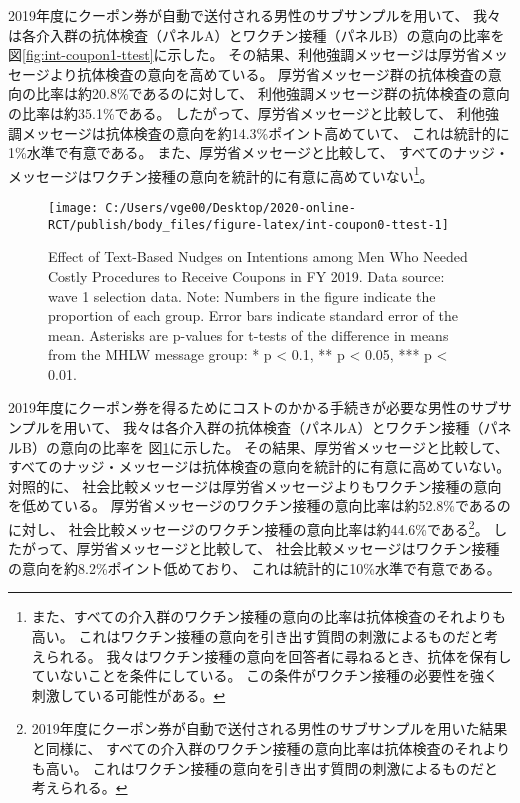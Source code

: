 \documentclass[
  11pt,
  a4paper,
]{article}
\begin{document}
2019年度にクーポン券が自動で送付される男性のサブサンプルを用いて、
我々は各介入群の抗体検査（パネルA）とワクチン接種（パネルB）の意向の比率を
図\ref{fig:int-coupon1-ttest}に示した。
その結果、利他強調メッセージは厚労省メッセージより抗体検査の意向を高めている。
厚労省メッセージ群の抗体検査の意向の比率は約20.8\%であるのに対して、
利他強調メッセージ群の抗体検査の意向の比率は約35.1\%である。
したがって、厚労省メッセージと比較して、
利他強調メッセージは抗体検査の意向を約14.3\%ポイント高めていて、
これは統計的に1\%水準で有意である。
また、厚労省メッセージと比較して、
すべてのナッジ・メッセージはワクチン接種の意向を統計的に有意に高めていない\footnote{また、すべての介入群のワクチン接種の意向の比率は抗体検査のそれよりも高い。
  これはワクチン接種の意向を引き出す質問の刺激によるものだと考えられる。
  我々はワクチン接種の意向を回答者に尋ねるとき、抗体を保有していないことを条件にしている。
  この条件がワクチン接種の必要性を強く刺激している可能性がある。}。

\begin{figure}[t]
\texttt{[image: C:/Users/vge00/Desktop/2020-online-RCT/publish/body\_files/figure-latex/int-coupon0-ttest-1]} \caption{Effect of Text-Based Nudges on Intentions among Men Who Needed Costly Procedures to Receive Coupons in FY 2019. Data source: wave 1 selection data. Note: Numbers in the figure indicate the proportion of each group. Error bars indicate standard error of the mean. Asterisks are p-values for t-tests of the difference in means from the MHLW message group: * p < 0.1, ** p < 0.05, *** p < 0.01.}\label{fig:int-coupon0-ttest}
\end{figure}

2019年度にクーポン券を得るためにコストのかかる手続きが必要な男性のサブサンプルを用いて、
我々は各介入群の抗体検査（パネルA）とワクチン接種（パネルB）の意向の比率を
図\ref{fig:int-coupon0-ttest}に示した。
その結果、厚労省メッセージと比較して、
すべてのナッジ・メッセージは抗体検査の意向を統計的に有意に高めていない。
対照的に、
社会比較メッセージは厚労省メッセージよりもワクチン接種の意向を低めている。
厚労省メッセージのワクチン接種の意向比率は約52.8\%であるのに対し、
社会比較メッセージのワクチン接種の意向比率は約44.6\%である\footnote{2019年度にクーポン券が自動で送付される男性のサブサンプルを用いた結果と同様に、
  すべての介入群のワクチン接種の意向比率は抗体検査のそれよりも高い。
  これはワクチン接種の意向を引き出す質問の刺激によるものだと考えられる。}。
したがって、厚労省メッセージと比較して、
社会比較メッセージはワクチン接種の意向を約8.2\%ポイント低めており、
これは統計的に10\%水準で有意である。
\end{document}
